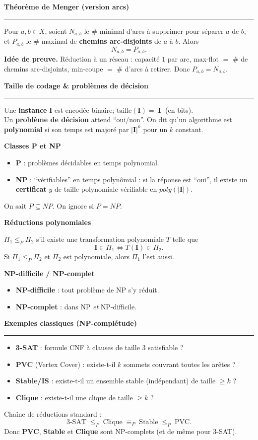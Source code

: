 \documentclass[9pt,a4paper]{article}
\newcommand{\sect}[1]{\vspace{1ex}\textbf{\large #1}\par\vspace{0.3ex}\hrule\vspace{0.6ex}}
\newcommand{\subsect}[1]{\vspace{0.4ex}\textbf{#1}\par}
\begin{document}
\begin{multicols}{3}
    \sect{Théorème de Menger (version arcs)}
    Pour $a,b\in X$, soient $N_{a,b}$ le \# minimal d'arcs à supprimer pour séparer $a$ de $b$, et $P_{a,b}$ le \# maximal de \textbf{chemins arc-disjoints} de $a$ à $b$. Alors
    \[
        N_{a,b}=P_{a,b}.
    \]
    \textbf{Idée de preuve.} Réduction à un réseau : capacité $1$ par arc, max-flot $=$ \# de chemins arc-disjoints, min-coupe $=$ \# d'arcs à retirer. Donc $P_{a,b}=N_{a,b}$.

    \sect{Taille de codage \& problèmes de décision}
    Une \textbf{instance} $\mathbf{I}$ est encodée binaire; $\mathrm{taille}(\mathbf{I})=|\mathbf{I}|$ (en bits). \\
    Un \textbf{problème de décision} attend ``oui/non''. On dit qu'un algorithme est \textbf{polynomial} si son temps est majoré par $|\mathbf{I}|^k$ pour un $k$ constant.

    \subsect{Classes P et NP}
    \begin{itemize}
        \item \textbf{P} : problèmes décidables en temps polynomial.
        \item \textbf{NP} : ``vérifiables'' en temps polynômial : si la réponse est ``oui'', il existe un \textbf{certificat} $y$ de taille polynomiale vérifiable en $poly(|\mathbf{I}|)$.
    \end{itemize}
    On sait $P\subseteq NP$. On ignore si $P=NP$.

    \subsect{Réductions polynomiales}
    $\Pi_1 \le_P \Pi_2$ s'il existe une transformation polynomiale $T$ telle que
    \[
        \mathbf{I}\in \Pi_1 \iff T(\mathbf{I})\in \Pi_2 .
    \]
    Si $\Pi_1 \le_P \Pi_2$ et $\Pi_2$ est polynomiale, alors $\Pi_1$ l'est aussi.

    \subsect{NP-difficile / NP-complet}
    \begin{itemize}
        \item \textbf{NP-difficile} : tout problème de NP s'y réduit.
        \item \textbf{NP-complet} : dans NP \emph{et} NP-difficile.
    \end{itemize}

    \sect{Exemples classiques (NP-complétude)}
    \begin{itemize}
        \item \textbf{3-SAT} : formule CNF à clauses de taille $3$ satisfiable ?
        \item \textbf{PVC} (Vertex Cover) : existe-t-il $k$ sommets couvrant toutes les arêtes ?
        \item \textbf{Stable/IS} : existe-t-il un ensemble stable (indépendant) de taille $\ge k$ ?
        \item \textbf{Clique} : existe-t-il une clique de taille $\ge k$ ?
    \end{itemize}
    Chaîne de réductions standard :
    \[
        \text{3-SAT} \;\le_P\; \text{Clique} \;\equiv_P\; \text{Stable} \;\le_P\; \text{PVC}.
    \]
    Donc \textbf{PVC}, \textbf{Stable} et \textbf{Clique} sont NP-complets (et de même pour 3-SAT).


\end{multicols}
\end{document}
